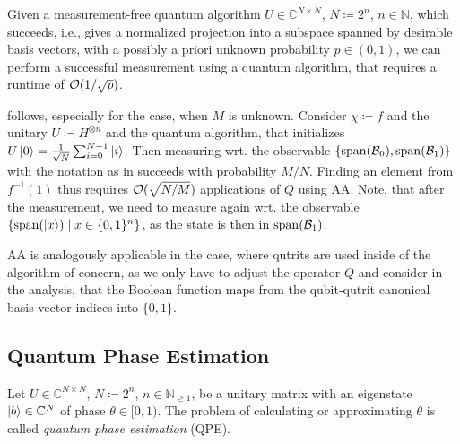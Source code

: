 \begin{theorem} \label{amplitude_amplification_theorem_unknown_probability}
    Given a measurement-free quantum algorithm \(U \in \mathbb{C}^{N \times N}\), \(N \coloneqq 2^n\), \(n \in \mathbb{N}\), which succeeds, i.e., gives a normalized projection into a subspace spanned by desirable basis vectors, with a possibly a priori unknown probability \(p \in (0, 1)\), we can perform a successful measurement using a quantum algorithm, that requires a runtime of \(\operatorname{\mathcal{O}}(1/\sqrt{p})\).
\end{theorem}

\begin{corollary}
     follows, especially for the case, when \(M\) is unknown. Consider \(\chi \coloneqq f\) and the unitary \(U \coloneqq H^{\otimes n}\) and the quantum algorithm, that initializes \(U\ket{0} = \frac{1}{\sqrt{N}}\sum_{i=0}^{N-1}\ket{i}\). Then measuring wrt. the observable \(\{\operatorname{span}(\mathcal{B}_0), \operatorname{span}(\mathcal{B}_1)\}\) with the notation as in  succeeds with probability \(M/N\). Finding an element from \(f^{-1}(1)\) thus requires \(\operatorname{\mathcal{O}}(\sqrt{N/M})\) applications of \(Q\) using AA. Note, that after the measurement, we need to measure again wrt. the observable \(\{\operatorname{span}(\ket{x}) \mid x \in \{0, 1\}^n\}\), as the state is then in \(\operatorname{span}(\mathcal{B}_1)\).
\end{corollary}

\begin{corollary}
    AA is analogously applicable in the case, where qutrits are used inside of the algorithm of concern, as we only have to adjust the operator \(Q\) and consider in the analysis, that the Boolean function maps from the qubit-qutrit canonical basis vector indices into \(\{0, 1\}\).
\end{corollary}

\subsection{Quantum Phase Estimation  }

\begin{problem}
    Let \(U \in \mathbb{C}^{N \times N}\), \(N \coloneqq 2^n\), \(n \in \mathbb{N}_{\geq 1}\), be a unitary matrix with an eigenstate \(\ket{b} \in \mathbb{C}^N\) of phase \(\theta \in [0, 1)\). The problem of calculating or approximating \(\theta\) is called \emph{quantum phase estimation} (QPE).
\end{problem}


